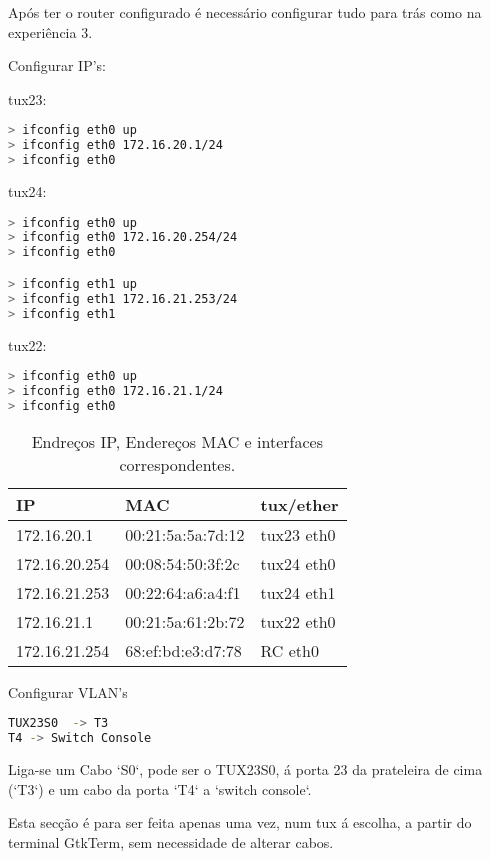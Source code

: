 Após ter o router configurado é necessário configurar tudo para trás como na experiência 3.

Configurar IP's:

tux23:
\begin{lstlisting}[language=bash]
> ifconfig eth0 up
> ifconfig eth0 172.16.20.1/24
> ifconfig eth0 
\end{lstlisting}

tux24:
\begin{lstlisting}[language=bash]
> ifconfig eth0 up
> ifconfig eth0 172.16.20.254/24
> ifconfig eth0 

> ifconfig eth1 up
> ifconfig eth1 172.16.21.253/24
> ifconfig eth1 
\end{lstlisting}

tux22:
\begin{lstlisting}[language=bash]
> ifconfig eth0 up
> ifconfig eth0 172.16.21.1/24
> ifconfig eth0 
\end{lstlisting}

\begin{table}[h]
    \centering
    \begin{tabular}{|l|l|l|}
    \hline
        IP & MAC & tux/ether \\ \hline
        172.16.20.1 & 00:21:5a:5a:7d:12 & tux23 eth0 \\ \hline
        172.16.20.254 & 00:08:54:50:3f:2c & tux24 eth0 \\ \hline
        172.16.21.253 & 00:22:64:a6:a4:f1 & tux24 eth1 \\ \hline
        172.16.21.1 & 00:21:5a:61:2b:72 & tux22 eth0 \\ \hline
        172.16.21.254 & 68:ef:bd:e3:d7:78 & RC eth0 \\ \hline
    \end{tabular}
    \caption{\label{tab:table-name}Endreços IP, Endereços MAC e interfaces correspondentes.}
\end{table}

Configurar VLAN's

\begin{lstlisting}[language=bash]
TUX23S0  -> T3
T4 -> Switch Console
\end{lstlisting}

Liga-se um Cabo `S0`, pode ser o TUX23S0, á porta 23 da prateleira de cima (`T3`) e um cabo da porta `T4` a `switch console`.

Esta secção é para ser feita apenas uma vez, num tux á escolha, a partir do terminal GtkTerm, sem necessidade de alterar cabos.

